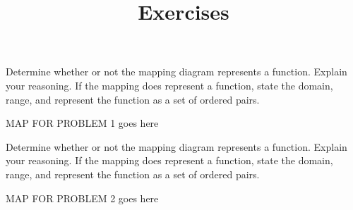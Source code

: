 \documentclass{ximera}
\title{Exercises} \license{CC BY-NC-SA 4.0}
\begin{document}
\begin{abstract}
\end{abstract}
\maketitle





\begin{problem}\label{mappingfirst}
Determine whether or not the mapping diagram represents a function. Explain your reasoning. If the mapping does represent a function, state the domain, range, and represent the function as a set of ordered pairs.

MAP FOR PROBLEM 1 goes here
\end{problem} 






\begin{problem}\label{mappinglast}
Determine whether or not the mapping diagram represents a function. Explain your reasoning. If the mapping does represent a function, state the domain, range, and represent the function as a set of ordered pairs.

    MAP FOR PROBLEM 2 goes here
\end{problem} 



\end{document}
